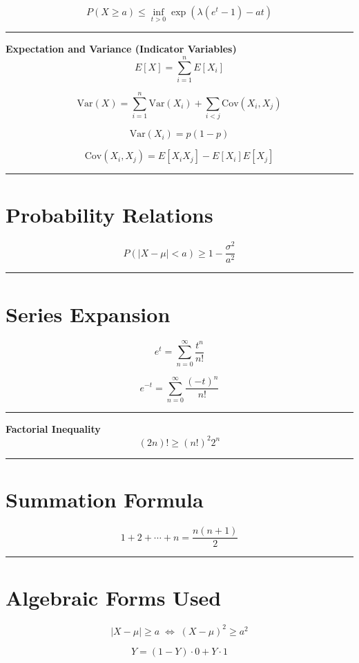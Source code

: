 \documentclass[12pt]{article}
\begin{document}
\[
P(X \ge a) \le \inf_{t>0} \exp\left(\lambda (e^t - 1) - at\right)
\]
\noindent\rule{\linewidth}{0.4pt}
\textbf{Expectation and Variance (Indicator Variables)}
\[
E[X] = \sum_{i=1}^{n} E[X_i]
\]

\[
\mathrm{Var}(X) = \sum_{i=1}^{n} \mathrm{Var}(X_i) + \sum_{i<j} \mathrm{Cov}(X_i, X_j)
\]

\[
\mathrm{Var}(X_i) = p(1 - p)
\]

\[
\mathrm{Cov}(X_i, X_j) = E[X_i X_j] - E[X_i]E[X_j]
\]
\noindent\rule{\linewidth}{0.4pt}
\section*{Probability Relations}

\[
P(|X - \mu| < a) \ge 1 - \frac{\sigma^2}{a^2}
\]
\noindent\rule{\linewidth}{0.4pt}

\section*{Series Expansion}
\[
e^t = \sum_{n=0}^{\infty} \frac{t^n}{n!}
\]

\[
e^{-t} = \sum_{n=0}^{\infty} \frac{(-t)^n}{n!}
\]
\noindent\rule{\linewidth}{0.4pt}
\textbf{Factorial Inequality}
\[
(2n)! \ge (n!)^2 2^n
\]
\noindent\rule{\linewidth}{0.4pt}
\section*{Summation Formula}

\[
1 + 2 + \cdots + n = \frac{n(n+1)}{2}
\]
\noindent\rule{\linewidth}{0.4pt}
\section*{Algebraic Forms Used}
\[
|X - \mu| \ge a \;\Longleftrightarrow\; (X - \mu)^2 \ge a^2
\]

\[
Y = (1 - Y)\cdot 0 + Y \cdot 1
\]
\end{document}
